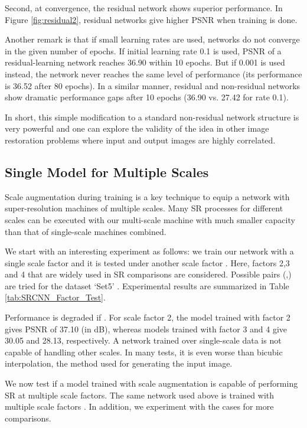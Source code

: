\documentclass[10pt,twocolumn,letterpaper]{article}
\begin{document}
Second, at convergence, the residual network shows superior performance. In Figure \ref{fig:residual2}, residual networks give higher PSNR when training is done.

Another remark is that if small learning rates are used, networks do not converge in the given number of epochs. If initial learning rate 0.1 is used, PSNR of a residual-learning network reaches 36.90 within 10 epochs. But if 0.001 is used instead, the network never reaches the same level of performance (its performance is 36.52 after 80 epochs). In a similar manner, residual and non-residual networks show dramatic performance gaps after 10 epochs (36.90 vs. 27.42 for rate 0.1).

In short, this simple modification to a standard non-residual network structure is very powerful and one can explore the validity of the idea in other image restoration problems where input and output images are highly correlated.

\subsection{Single Model for Multiple Scales}
Scale augmentation during training is a key technique to equip a network with super-resolution machines of multiple scales. Many SR processes for different scales can be executed with our multi-scale machine with much smaller capacity than that of single-scale machines combined. 

We start with an interesting experiment as follows: we train our network with a single scale factor  and it is tested under another scale factor . Here, factors 2,3 and 4 that are widely used in SR comparisons are considered. Possible pairs (,) are tried for the dataset `Set5' \cite{bevilacqua2012}. Experimental results are summarized in Table \ref{tab:SRCNN_Factor_Test}. 

Performance is degraded if . For scale factor 2, the model trained with factor 2 gives PSNR of 37.10 (in dB), whereas models trained with factor 3 and 4 give 30.05 and 28.13, respectively. A network trained over single-scale data is not capable of handling other scales. In many tests, it is even worse than bicubic interpolation, the method used for generating the input image. 

We now test if a model trained with scale augmentation is capable of performing SR at multiple scale factors. The same network used above is trained with multiple scale factors . In addition, we experiment with the cases  for more comparisons. 
\end{document}
